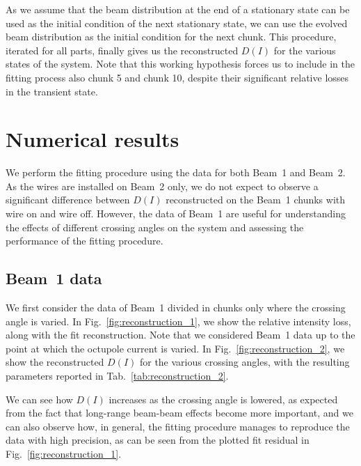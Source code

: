 As we assume that the beam distribution at the end of a stationary state can be used as the initial condition of the next stationary state, we can use the evolved beam distribution as the initial condition for the next chunk. This procedure, iterated for all parts, finally gives us the reconstructed $D(I)$ for the various states of the system. Note that this working hypothesis forces us to include in the fitting process also chunk 5 and chunk 10, despite their significant relative losses in the transient state.

\section{Numerical results}\label{sec:5:results}

We perform the fitting procedure using the data for both Beam~1 and Beam~2. As the wires are installed on Beam~2 only, we do not expect to observe a significant difference between $D(I)$ reconstructed on the Beam~1 chunks with wire on and wire off. However, the data of Beam~1 are useful for understanding the effects of different crossing angles on the system and assessing the performance of the fitting procedure.

\subsection*{Beam~1 data}

We first consider the data of Beam~1 divided in chunks only where the crossing angle is varied. In Fig.~\ref{fig:reconstruction_1}, we show the relative intensity loss, along with the fit reconstruction. Note that we considered Beam~1 data up to the point at which the octupole current is varied. In Fig.~\ref{fig:reconstruction_2}, we show the reconstructed $D(I)$ for the various crossing angles, with the resulting parameters reported in Tab.~\ref{tab:reconstruction_2}.

We can see how $D(I)$ increases as the crossing angle is lowered, as expected from the fact that long-range beam-beam effects become more important, and we can also observe how, in general, the fitting procedure manages to reproduce the data with high precision, as can be seen from the plotted fit residual in Fig.~\ref{fig:reconstruction_1}. %

